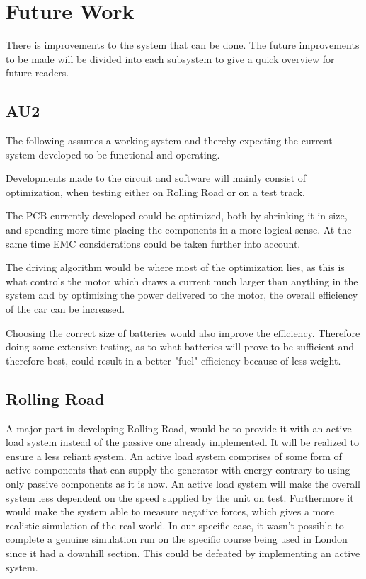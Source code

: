 \chapter {Future Work}
There is improvements to the system that can be done. The future improvements to be made will be divided into each subsystem to give a quick overview for future readers. 

\section{AU2}
The following assumes a working system and thereby expecting the current system developed to be functional and operating.

Developments made to the circuit and software will mainly consist of optimization, when testing either on Rolling Road or on a test track. 

The PCB currently developed could be optimized, both by shrinking it in size, and spending more time placing the components in a more logical sense. At the same time EMC considerations could be taken further into account. 

The driving algorithm would be where most of the optimization lies, as this is what controls the motor which draws a current much larger than anything in the system and by optimizing the power delivered to the motor, the overall efficiency of the car can be increased. 

Choosing the correct size of batteries would also improve the efficiency. Therefore doing some extensive testing, as to what batteries will prove to be sufficient and therefore best, could result in a better "fuel" efficiency because of less weight.  

\section{Rolling Road}
A major part in developing Rolling Road, would be to provide it with an active load system instead of the passive one already implemented. It will be realized to ensure a less reliant system. An active load system comprises of some form of active components that can supply the generator with energy contrary to using only passive components as it is now. An active load system will make the overall system less dependent on the speed supplied by the unit on test. Furthermore it would make the system able to measure negative forces, which gives a more realistic simulation of the real world. In our specific case, it wasn't possible to complete a  genuine simulation run on the specific course being used in London since it had a downhill section. This could be defeated by implementing an active system. 

